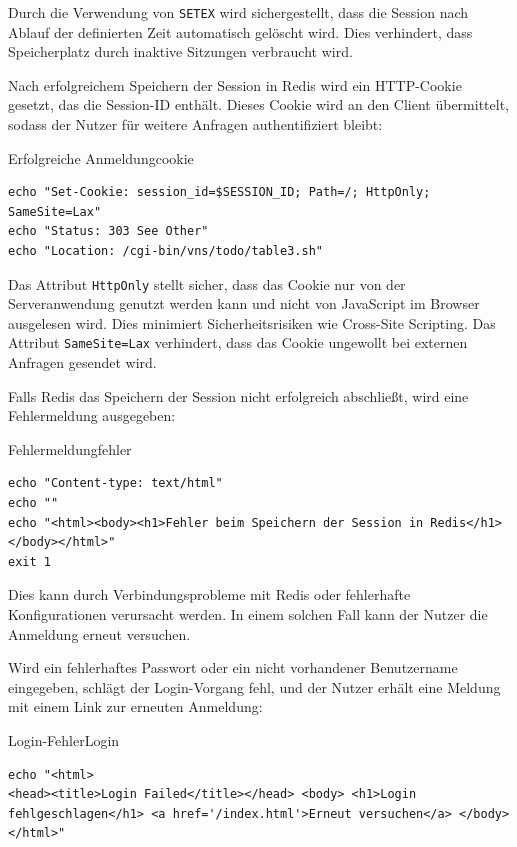 Durch die Verwendung von \texttt{SETEX} wird sichergestellt, dass die Session nach Ablauf der definierten Zeit automatisch gelöscht wird. Dies verhindert, dass Speicherplatz durch inaktive Sitzungen verbraucht wird.

Nach erfolgreichem Speichern der Session in Redis wird ein HTTP-Cookie gesetzt, das die Session-ID enthält. Dieses Cookie wird an den Client übermittelt, sodass der Nutzer für weitere Anfragen authentifiziert bleibt:

\begin{code}{Erfolgreiche Anmeldung}{cookie}
        \begin{verbatim}
echo "Set-Cookie: session_id=$SESSION_ID; Path=/; HttpOnly; SameSite=Lax"
echo "Status: 303 See Other"
echo "Location: /cgi-bin/vns/todo/table3.sh"
  \end{verbatim}
\end{code}

Das Attribut \texttt{HttpOnly} stellt sicher, dass das Cookie nur von der Serveranwendung genutzt werden kann und nicht von JavaScript im Browser ausgelesen wird. Dies minimiert Sicherheitsrisiken wie Cross-Site Scripting. Das Attribut \texttt{SameSite=Lax} verhindert, dass das Cookie ungewollt bei externen Anfragen gesendet wird.

Falls Redis das Speichern der Session nicht erfolgreich abschließt, wird eine Fehlermeldung ausgegeben:

\begin{code}{Fehlermeldung}{fehler}
        \begin{verbatim}
echo "Content-type: text/html"
echo ""
echo "<html><body><h1>Fehler beim Speichern der Session in Redis</h1></body></html>"
exit 1
  \end{verbatim}
\end{code}

Dies kann durch Verbindungsprobleme mit Redis oder fehlerhafte Konfigurationen verursacht werden. In einem solchen Fall kann der Nutzer die Anmeldung erneut versuchen.

Wird ein fehlerhaftes Passwort oder ein nicht vorhandener Benutzername eingegeben, schlägt der Login-Vorgang fehl, und der Nutzer erhält eine Meldung mit einem Link zur erneuten Anmeldung:

\begin{code}{Login-Fehler}{Login}
        \begin{verbatim}
echo "<html>
<head><title>Login Failed</title></head> <body> <h1>Login fehlgeschlagen</h1> <a href='/index.html'>Erneut versuchen</a> </body> </html>"
  \end{verbatim}
\end{code}


